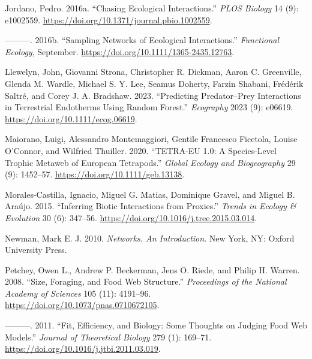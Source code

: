 \documentclass[
  letterpaper,
  DIV=11,
  numbers=noendperiod]{scrartcl}
\newlength{\cslhangindent}
\newenvironment{CSLReferences}[2] %
 {\begin{list}{}{%
  \setlength{\itemindent}{0pt}
  \setlength{\leftmargin}{0pt}
  \setlength{\parsep}{0pt}
  \ifodd #1
   \setlength{\leftmargin}{\cslhangindent}
   \setlength{\itemindent}{-1\cslhangindent}
  \fi
  \setlength{\itemsep}{#2\baselineskip}}}
 {\end{list}}
\begin{document}
\begin{CSLReferences}{1}{0}
Jordano, Pedro. 2016a. {``Chasing {Ecological Interactions}.''}
\emph{PLOS Biology} 14 (9): e1002559.
\url{https://doi.org/10.1371/journal.pbio.1002559}.

---------. 2016b. {``Sampling Networks of Ecological Interactions.''}
\emph{Functional Ecology}, September.
\url{https://doi.org/10.1111/1365-2435.12763}.

Llewelyn, John, Giovanni Strona, Christopher R. Dickman, Aaron C.
Greenville, Glenda M. Wardle, Michael S. Y. Lee, Seamus Doherty, Farzin
Shabani, Frédérik Saltré, and Corey J. A. Bradshaw. 2023. {``Predicting
Predator--Prey Interactions in Terrestrial Endotherms Using Random
Forest.''} \emph{Ecography} 2023 (9): e06619.
\url{https://doi.org/10.1111/ecog.06619}.

Maiorano, Luigi, Alessandro Montemaggiori, Gentile Francesco Ficetola,
Louise O'Connor, and Wilfried Thuiller. 2020. {``{TETRA-EU} 1.0: {A}
Species-Level Trophic Metaweb of {European} Tetrapods.''} \emph{Global
Ecology and Biogeography} 29 (9): 1452--57.
\url{https://doi.org/10.1111/geb.13138}.

Morales-Castilla, Ignacio, Miguel G. Matias, Dominique Gravel, and
Miguel B. Araújo. 2015. {``Inferring Biotic Interactions from
Proxies.''} \emph{Trends in Ecology \& Evolution} 30 (6): 347--56.
\url{https://doi.org/10.1016/j.tree.2015.03.014}.

Newman, Mark E. J. 2010. \emph{Networks. {An} Introduction}. New York,
NY: Oxford University Press.

Petchey, Owen L., Andrew P. Beckerman, Jens O. Riede, and Philip H.
Warren. 2008. {``Size, Foraging, and Food Web Structure.''}
\emph{Proceedings of the National Academy of Sciences} 105 (11):
4191--96. \url{https://doi.org/10.1073/pnas.0710672105}.

---------. 2011. {``Fit, Efficiency, and Biology: {Some} Thoughts on
Judging Food Web Models.''} \emph{Journal of Theoretical Biology} 279
(1): 169--71. \url{https://doi.org/10.1016/j.jtbi.2011.03.019}.


\end{CSLReferences}
\end{document}
